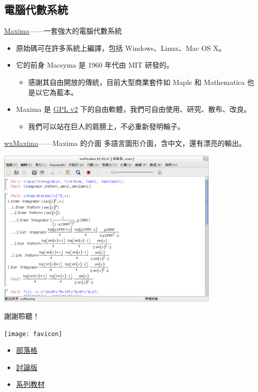 \documentclass{beamer}
\theoremstyle{remark}
\begin{document}
\begin{CJK}{UTF8}{bsmi}
\section{電腦代數系統}
\begin{frame}{\href{http://maxima.sourceforge.net/}{Maxima}------一套強大的電腦代數系統}
  \begin{itemize}
    \item 原始碼可在許多系統上編譯，包括 Windows、Linux、Mac OS X。
    \item 它的前身 Macsyma 是 1960 年代由 MIT 研發的。
      \begin{itemize}
	\item 感謝其自由開放的傳統，目前大型商業套件如 Maple 和 Mathematica 也是以它為藍本。
      \end{itemize}
    \item Maxima 是 \href{http://www.gnu.org/licenses/gpl-2.0.html}{GPL v2}
      下的自由軟體，我們可自由使用、研究、散布、改良。
      \begin{itemize}
	\item 我們可以站在巨人的肩膀上，不必重新發明輪子。
      \end{itemize}
  \end{itemize}
\end{frame}

\begin{frame}{\href{http://andrejv.github.com/wxmaxima/}{wxMaxima}------Maxima 的介面}
  多語言圖形介面，含中文，還有漂亮的輸出。
  \begin{center}
    \href{http://andrejv.github.com/wxmaxima/}{\includegraphics[width=0.8\textwidth]{screenshot}}
  \end{center}
\end{frame}

\begin{frame}{謝謝聆聽！}
  \begin{center}
    \texttt{[image: favicon]}
  \end{center}
  \begin{itemize}
    \item \href{http://jdh8.org/}{部落格}
    \item \href{http://boards.jdh8.org/cal/}{討論版}
    \item \href{https://github.com/jdh8/calculus-2012}{系列教材}
  \end{itemize}
\end{frame}
\end{CJK}
\end{document}
